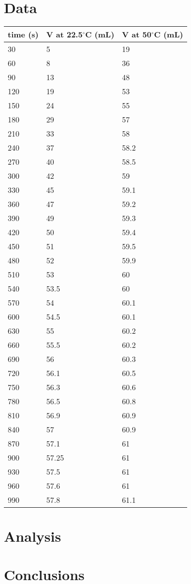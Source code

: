 \documentclass[12pt]{article}
\begin{document}
	\section{Data}
	\begin{flushleft}
	\begin{tabular}{ l|l|l }
		time (s) & V at 22.5$^\circ$C (mL) & V at 50$^\circ$C (mL) \\
		\hline
		30 & 5 & 19 \\
		60 & 8 & 36 \\
		90 & 13 & 48 \\
		120 & 19 & 53 \\
		150 & 24 & 55 \\
		180 & 29 & 57 \\
		210 & 33 & 58 \\
		240 & 37 & 58.2 \\
		270 & 40 & 58.5 \\
		300 & 42 & 59 \\
		330 & 45 & 59.1 \\
		360 & 47 & 59.2 \\
		390 & 49 & 59.3 \\
		420 & 50 & 59.4 \\
		450 & 51 & 59.5 \\
		480 & 52 & 59.9 \\
		510 & 53 & 60 \\
		540 & 53.5 & 60 \\
		570 & 54 & 60.1 \\
		600 & 54.5 & 60.1 \\
		630 & 55 & 60.2 \\
		660 & 55.5 & 60.2 \\
		690 & 56 & 60.3 \\
		720 & 56.1 & 60.5 \\
		750 & 56.3 & 60.6 \\
		780 & 56.5 & 60.8 \\
		810 & 56.9 & 60.9 \\
		840 & 57 & 60.9 \\
		870 & 57.1 & 61 \\
		900 & 57.25 & 61 \\
		930 & 57.5 & 61 \\
		960 & 57.6 & 61 \\
		990 & 57.8 & 61.1
	\end{tabular}
	\end{flushleft}

	\section{Analysis}

	\section{Conclusions}
	
\end{document}
